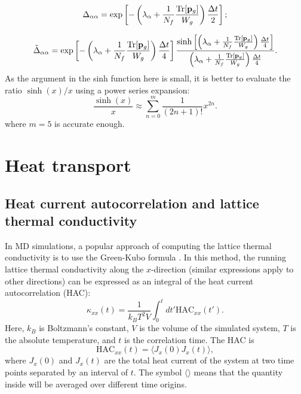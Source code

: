 \documentclass[12pt,a4paper]{report}
\begin{document}
\begin{equation}
\Delta_{\alpha\alpha} = \exp\left[-\left(\lambda_{\alpha} + \frac{1}{N_f} \frac{\textmd{Tr}[\mathbf{p}_g]}{W_g}\right)\frac{\Delta t}{2}\right] ;
\end{equation}

\begin{equation}
\tilde{\Delta}_{\alpha\alpha} = \exp\left[-\left(\lambda_{\alpha} + \frac{1}{N_f} \frac{\textmd{Tr}[\mathbf{p}_g]}{W_g}\right)\frac{\Delta t}{4}\right] \frac{\sinh\left[\left(\lambda_{\alpha} + \frac{1}{N_f} \frac{\textmd{Tr}[\mathbf{p}_g]}{W_g}\right)\frac{\Delta t}{4}\right]}{\left(\lambda_{\alpha} + \frac{1}{N_f} \frac{\textmd{Tr}[\mathbf{p}_g]}{W_g}\right)\frac{\Delta t}{4}}.
\end{equation}
As the argument in the sinh function here is small, it is better to evaluate the ratio $\sinh(x)/x$ using a power series expansion:
\begin{equation}
\frac{\sinh(x)}{x} \approx \sum_{n=0}^m\frac{1}{(2n+1)!} x^{2n}.
\end{equation} 
where $m=5$ is accurate enough.


\section{Heat transport}



\subsection{Heat current autocorrelation and lattice thermal conductivity}

In MD simulations, a popular approach of computing the lattice thermal conductivity is to use the Green-Kubo formula \cite{green1954jcp,kubo1957jpsj}.
In this method, the running lattice thermal conductivity along the $x$-direction (similar expressions apply to other directions) can be expressed as an integral of the heat current autocorrelation (HAC):
\begin{equation}
\label{equation:green-kubo-kappa}
\boxed{
\kappa_{xx}(t) = \frac{1}{k_BT^2V} \int_0^{t} dt' \text{HAC}_{xx}(t')
}.
\end{equation}
Here, $k_B$ is Boltzmann's constant, $V$ is the volume of the simulated system, $T$ is the absolute temperature, and $t$ is the correlation time. The HAC is
\begin{equation}
\boxed{
\text{HAC}_{xx}(t)=\langle J_{x}(0)J_{x}(t)\rangle
},
\end{equation}
where $J_{x}(0)$ and $J_{x}(t)$ are the total heat current of the system at two time points separated by an interval of $t$. The symbol $\langle \rangle$ means that the quantity inside will be averaged over different time origins.
\end{document}
